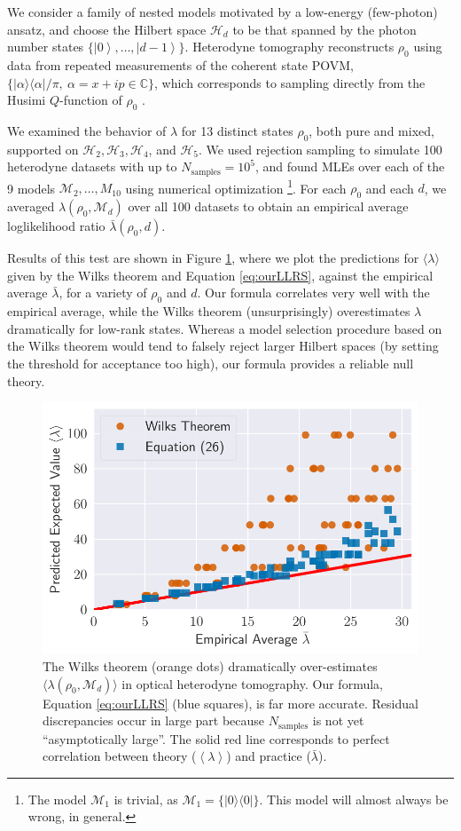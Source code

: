 \documentclass[aps,pra, twocolumn]{revtex4-1}
\newcommand{\M}{\mathcal{M}}
\newcommand{\ket}[1]{\ensuremath{\left|#1\right\rangle}}
\newcommand{\expect}[1]{\ensuremath{\left\langle#1\right\rangle}}
\begin{document}
We consider a family of nested models motivated by a low-energy (few-photon) ansatz, and choose   
the Hilbert space $\mathcal{H}_d$ to be that spanned by the photon number states $\{\ket{0},\ldots ,\ket{d-1}\}$.
Heterodyne tomography reconstructs $\rho_{0}$ using data from repeated measurements of the 
coherent state POVM, $\{|\alpha\rangle\langle \alpha| /\pi, ~\alpha=x+ip\in \mathbb{C}\}$, which corresponds to sampling directly from the Husimi $Q$-function of $\rho_{0}$ \cite{Husimi1940}.

We examined the behavior of $\lambda$ for 13 distinct states $\rho_{0}$, both pure and mixed, supported on $\mathcal{H}_{2}, \mathcal{H}_{3}, \mathcal{H}
_{4}$, and $\mathcal{H}_{5}$.  We used rejection sampling to simulate 100 heterodyne datasets with up to $N_{\mathrm{samples}}=10^5$, and found MLEs over each of the 9 models $\M_2, \ldots, M_{10}$ using numerical optimization \footnote{The model $\M_{1}$ is trivial, as $\M_{1} = \{|0\rangle \langle 0|\}$. This model will almost always be wrong, in general.}.  For each $\rho_{0}$ and each $d$, we averaged $\lambda(\rho_{0}, \M_{d})$ over all 100 datasets to obtain an empirical average loglikelihood ratio $\bar{\lambda}(\rho_0,d)$.

Results of this test are shown in Figure \ref{fig:modelcomp}, where we plot the predictions for $\langle \lambda \rangle$ given by the Wilks theorem and Equation \eqref{eq:ourLLRS}, against the empirical average $\bar\lambda$, for a variety of $\rho_{0}$ and $d$. Our formula correlates very well with the empirical average, while the Wilks theorem (unsurprisingly) overestimates $\lambda$ dramatically for low-rank states.  Whereas a model selection procedure based on the Wilks theorem would tend to falsely reject larger Hilbert spaces (by setting the threshold for acceptance too high), our formula provides a reliable null theory.

\begin{figure}
 \includegraphics[width=.9\columnwidth]{Images/Figure_11.pdf}
 \caption{The Wilks theorem (orange dots) dramatically over-estimates $\langle\lambda(\rho_{0}, \M_{d})\rangle$ in optical heterodyne tomography. Our formula, Equation \ref{eq:ourLLRS} (blue squares), is far more accurate. Residual discrepancies occur in large part because $N_{\mathrm{samples}}$ is not yet ``asymptotically large''. The solid red line corresponds to perfect correlation between theory ($\expect{\lambda}$) and practice ($\bar\lambda$).}
 \label{fig:modelcomp}
\end{figure}
\end{document}
